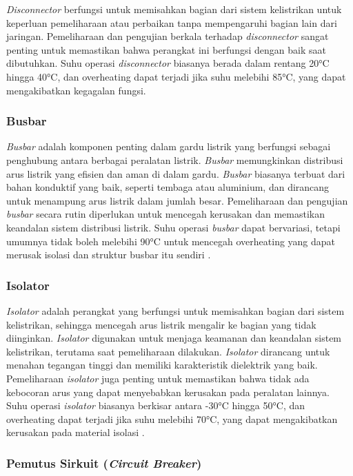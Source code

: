 \emph{Disconnector} berfungsi untuk memisahkan bagian dari sistem kelistrikan untuk keperluan pemeliharaan atau perbaikan tanpa mempengaruhi bagian lain dari jaringan. Pemeliharaan dan pengujian berkala terhadap \emph{disconnector} sangat penting untuk memastikan bahwa perangkat ini berfungsi dengan baik saat dibutuhkan. Suhu operasi \emph{disconnector} biasanya berada dalam rentang 20°C hingga 40°C, dan overheating dapat terjadi jika suhu melebihi 85°C, yang dapat mengakibatkan kegagalan fungsi\cite{Henriana2022}.

\subsubsection{Busbar}
\emph{Busbar} adalah komponen penting dalam gardu listrik yang berfungsi sebagai penghubung antara berbagai peralatan listrik. \emph{Busbar} memungkinkan distribusi arus listrik yang efisien dan aman di dalam gardu. \emph{Busbar} biasanya terbuat dari bahan konduktif yang baik, seperti tembaga atau aluminium, dan dirancang untuk menampung arus listrik dalam jumlah besar. Pemeliharaan dan pengujian \emph{busbar} secara rutin diperlukan untuk mencegah kerusakan dan memastikan keandalan sistem distribusi listrik. Suhu operasi \emph{busbar} dapat bervariasi, tetapi umumnya tidak boleh melebihi 90°C untuk mencegah overheating yang dapat merusak isolasi dan struktur busbar itu sendiri \cite{Telaumbanua2024}.

\subsubsection{Isolator}
\emph{Isolator} adalah perangkat yang berfungsi untuk memisahkan bagian dari sistem kelistrikan, sehingga mencegah arus listrik mengalir ke bagian yang tidak diinginkan. \emph{Isolator} digunakan untuk menjaga keamanan dan keandalan sistem kelistrikan, terutama saat pemeliharaan dilakukan. \emph{Isolator} dirancang untuk menahan tegangan tinggi dan memiliki karakteristik dielektrik yang baik. Pemeliharaan \emph{isolator} juga penting untuk memastikan bahwa tidak ada kebocoran arus yang dapat menyebabkan kerusakan pada peralatan lainnya. Suhu operasi \emph{isolator} biasanya berkisar antara -30°C hingga 50°C, dan overheating dapat terjadi jika suhu melebihi 70°C, yang dapat mengakibatkan kerusakan pada material isolasi \cite{Moreno2017}.

\subsubsection{Pemutus Sirkuit (\emph{Circuit Breaker})}

